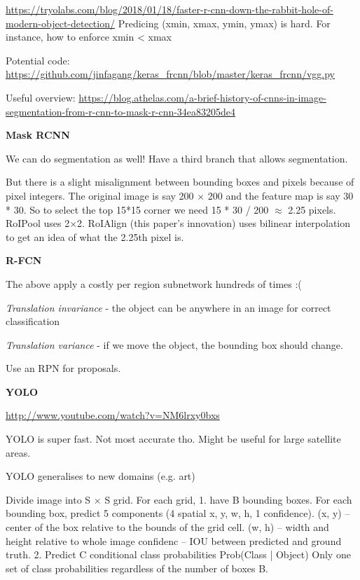 \documentclass[12pt, a4paper, oneside, headinclude, footinclude]{article}
\begin{document}
\url{https://tryolabs.com/blog/2018/01/18/faster-r-cnn-down-the-rabbit-hole-of-modern-object-detection/}
Predicing (xmin, xmax, ymin, ymax) is hard. For instance, how to enforce
xmin < xmax

Potential code:
\url{https://github.com/jinfagang/keras\_frcnn/blob/master/keras\_frcnn/vgg.py}

Useful overview:
\url{https://blog.athelas.com/a-brief-history-of-cnns-in-image-segmentation-from-r-cnn-to-mask-r-cnn-34ea83205de4}

\textbf{Mask RCNN}~\cite{he2017}

We can do segmentation as well! Have a third branch that allows segmentation. 

But there is a slight misalignment between bounding boxes and pixels because
of pixel integers. The original image is say 200 $\times$ 200 and the feature map is
say 30 * 30. So to select the top 15*15 corner we need 15 * 30 / 200 $\approx$
2.25 pixels. RoIPool uses 2$\times$2. RoIAlign (this paper's innovation) uses
bilinear interpolation to get an idea of what the 2.25th pixel is.


\textbf{R-FCN}~\cite{NIPS2016_6465}

The above apply a costly per region subnetwork hundreds of times :(

\textit{Translation invariance} - the object can be anywhere in an image for
correct classification

\textit{Translation variance} - if we move the object, the bounding box should
change. 

Use an RPN for proposals.

\textbf{YOLO}~\cite{redmon2016yolo}

\url{http://www.youtube.com/watch?v=NM6lrxy0bxs}

YOLO is super fast. Not most accurate tho. Might be useful for large satellite
areas.

YOLO generalises to new domains (e.g. art)

Divide image into S $\times$ S grid. 
For each grid, 
    1. have B bounding boxes. 
    For each bounding box, 
        predict 5 components (4 spatial {x, y, w, h}, 1 confidence). 
        (x, y) -- center of the box relative to the bounds of the grid cell. 
        (w, h) -- width and height relative to whole image
        confidenc -- IOU between predicted and ground truth.
    2. Predict C conditional class probabilities
       Prob(Class | Object)
       Only one set of class probabilities regardless of the number of boxes
       B.
\end{document}

